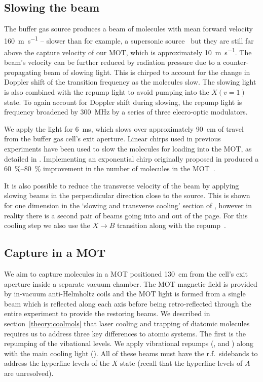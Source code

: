 \subsection{Slowing the beam}

The buffer gas source produces a beam of molecules with mean forward velocity
\SI{160}{\meter\per\second} -- slower than for example, a supersonic
source~\cite{Mathavan2016} but they are still far above the capture velocity of
our MOT, which is approximately \SI{10}{\meter\per\second}. The beam's velocity
can be further reduced by radiation pressure due to a counter-propagating beam
of  slowing light. This is chirped to account for the change in
Doppler shift of the transition frequency as the molecules slow. The slowing
light is also combined with the  repump light to avoid pumping
into the $X(v=1)$ state. To again account for Doppler shift during slowing, the
repump light is frequency broadened by \SI{300}{\mega\hertz} by a series of
three elecro-optic modulators.

We apply the light for \SI{6}{\milli\second}, which slows over approximately
\SI{90}{\centi\meter} of travel from the buffer gas cell's exit aperture.
Linear chirps used in previous experiments have been used to slow the molecules
for loading into the MOT, as detailed in . Implementing an
exponential chirp originally proposed in   produced a
\SIrange{60}{80}{\percent} improvement in the number of molecules in the
MOT~\cite{Jurgilas2021}.

It is also possible to reduce the transverse velocity of the beam by applying
slowing beams in the perpendicular direction close to the source. This is shown
for one dimension in the `slowing and transverse cooling' section of
, however in reality there is a second pair
of beams going into and out of the page. For this cooling step we also use the
$X\rightarrow B$ transition along with the 
repump~\cite{Jurgilas2021}.

\subsection{Capture in a MOT}
\label{overview:MOT}

We aim to capture molecules in a MOT positioned \SI{130}{\centi\meter} from the
cell's exit aperture inside a separate vacuum chamber. The MOT magnetic field
is provided by in-vacuum anti-Helmholtz coils and the MOT light is formed from
a single beam which is reflected along each axis before being retro-reflected
through the entire experiment to provide the restoring beams.
%
We described in section~\ref{theory:coolmols} that laser cooling and trapping of diatomic
molecules requires us to address three key differences to atomic systems. The
first is the repumping of the vibational levels. We apply vibrational repumps (, 
and ) along with the main cooling light ().  All of these beams must have the r.f.\ sidebands
to address the hyperfine levels of the $X$ state (recall that the hyperfine
levels of $A$ are unresolved).

